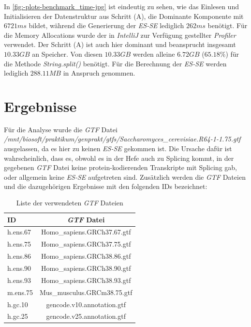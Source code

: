 \documentclass[12pt]{article}
\begin{document}
In \ref{fig:-plots-benchmark_time-jpg} ist eindeutig zu sehen, wie das Einlesen und Initialisieren
der Datenstruktur aus Schritt (A), die Dominante Komponente mit $6721ms$ bildet, während die Generierung der
\textit{ES-SE} lediglich $262ms$ benötigt.
Für die Memory Allocations wurde der in \textit{IntelliJ} zur Verfügung gestellter \textit{Profiler} verwendet.
Der Schritt (A) ist auch hier dominant und beansprucht insgesamt $10.33GB$ an Speicher.
Von diesen $10.33GB$ werden alleine $6.72GB$ ($65.18\%$) für die Methode \textit{String.split()} benötigt.
Für die Berechnung der \textit{ES-SE} werden lediglich $288.11MB$ in Anspruch genommen.



\section{Ergebnisse}
Für die Analyse wurde die \textit{GTF} Datei \textit{/mnt/biosoft/praktikum/genprakt/gtfs/Saccharomyces\_cerevisiae.R64-1-1.75.gtf} ausgelassen,
da es hier zu keinen \textit{ES-SE} gekommen ist. Die Ursache dafür ist wahrscheinlich, dass
es, obwohl es in der Hefe auch zu Splicing kommt, in der gegebenen \textit{GTF} Datei keine protein-kodierenden Transkripte mit
Splicing gab, oder allgemein keine \textit{ES-SE} aufgetreten sind. Zusätzlich werden die \textit{GTF} Dateien und die
dazugehörigen Ergebnisse mit den folgenden IDs bezeichnet:

\begin{table}[htpb]
	\centering
	\caption{Liste der verwendeten \textit{GTF} Dateien}
	\label{tab:label}
	\begin{tabular}{l|c}
		\textbf{ID} & \textbf{\textit{GTF} Datei} \\ \hline
		h.ens.67    & Homo\_sapiens.GRCh37.67.gtf \\
		h.ens.75    & Homo\_sapiens.GRCh37.75.gtf \\
		h.ens.86    & Homo\_sapiens.GRCh38.86.gtf \\
		h.ens.90    & Homo\_sapiens.GRCh38.90.gtf \\
		h.ens.93    & Homo\_sapiens.GRCh38.93.gtf \\
		m.ens.75    & Mus\_musculus.GRCm38.75.gtf \\
		h.gc.10     & gencode.v10.annotation.gtf  \\
		h.gc.25     & gencode.v25.annotation.gtf  \\
	\end{tabular}
\end{table}
\end{document}
